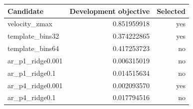 \begin{tabular}{lrr}
\toprule
Candidate & Development objective & Selected \\
\midrule
velocity\_zmax & 0.851959918 & yes \\
template\_bins32 & 0.374222865 & yes \\
template\_bins64 & 0.417253723 & no \\
ar\_p1\_ridge0.001 & 0.006315019 & no \\
ar\_p1\_ridge0.1 & 0.014515634 & no \\
ar\_p4\_ridge0.001 & 0.002093570 & yes \\
ar\_p4\_ridge0.1 & 0.017794516 & no \\
\bottomrule
\end{tabular}
